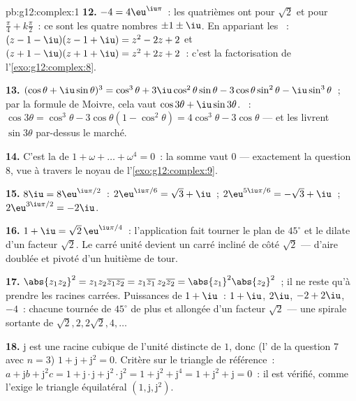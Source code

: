 \begin{solution}{pb:g12:complex:1}
\textbf{12.} $-4 = 4\eu^{\iu\pi}$~: les  quatrièmes ont pour
 $\sqrt2$ et pour 
$\frac{\pi}{4} + k\frac{\pi}{2}$~: ce sont les quatre nombres
$\pm 1 \pm \iu$. En appariant les ~:
$(z - 1 - \iu)(z - 1 + \iu) = z^2 - 2z + 2$ et
$(z + 1 - \iu)(z + 1 + \iu) = z^2 + 2z + 2$~: c'est la
factorisation de l'\cref{exo:g12:complex:8}.

\textbf{13.} $(\cos\theta + \iu\sin\theta)^3 = \cos^3\theta +
3\iu\cos^2\theta\sin\theta - 3\cos\theta\sin^2\theta -
\iu\sin^3\theta$~; par la formule de Moivre, cela vaut
$\cos 3\theta + \iu \sin 3\theta$. ~:
$\cos 3\theta = \cos^3\theta - 3\cos\theta(1 - \cos^2\theta)
= 4\cos^3\theta - 3\cos\theta$ --- et les 
livrent $\sin 3\theta$ par-dessus le marché.

\textbf{14.} C'est la  de
$1 + \omega + \dots + \omega^4 = 0$~: la somme vaut $0$ ---
exactement la question 8, vue à travers le noyau de
l'\cref{exo:g12:complex:9}.

\textbf{15.} $8\iu = 8\eu^{\iu\pi/2}$~: 
$2\eu^{\iu\pi/6} = \sqrt3 + \iu$~;
$2\eu^{5\iu\pi/6} = -\sqrt3 + \iu$~;
$2\eu^{3\iu\pi/2} = -2\iu$.

\textbf{16.} $1 + \iu = \sqrt2\,\eu^{\iu\pi/4}$~: l'application
fait tourner le plan de $45^\circ$ et le dilate d'un facteur
$\sqrt2$. Le carré unité devient un carré incliné de côté $\sqrt2$
--- d'aire doublée et pivoté d'un huitième de tour.

\textbf{17.} $\abs{z_1 z_2}^2 = z_1 z_2 \overline{z_1 z_2} =
z_1\overline{z_1}\, z_2\overline{z_2} =
\abs{z_1}^2\abs{z_2}^2$~; il ne reste qu'à prendre les racines
carrées. Puissances de $1 + \iu$~: $1 + \iu$, $2\iu$,
$-2 + 2\iu$, $-4$~: chacune tournée de $45^\circ$ de plus et
allongée d'un facteur $\sqrt2$ --- une spirale sortante de 
$\sqrt2, 2, 2\sqrt2, 4, \dots$

\textbf{18.} $\mathrm{j}$ est une racine cubique de l'unité
distincte de $1$, donc (l' de la question 7 avec $n = 3$)
$1 + \mathrm{j} + \mathrm{j}^2 = 0$. Critère sur le triangle de
référence~: $a + \mathrm{j}b + \mathrm{j}^2 c = 1 +
\mathrm{j}\cdot\mathrm{j} + \mathrm{j}^2 \cdot \mathrm{j}^2 =
1 + \mathrm{j}^2 + \mathrm{j}^4 = 1 + \mathrm{j}^2 +
\mathrm{j} = 0$~: il est vérifié, comme l'exige le triangle
équilatéral $\left(1, \mathrm{j}, \mathrm{j}^2\right)$.


\end{solution}
